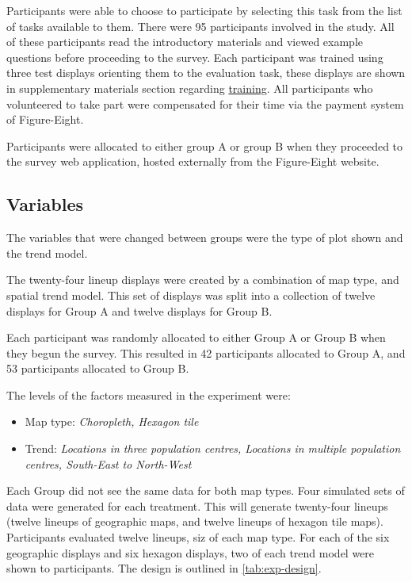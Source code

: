 \documentclass[conference,final,]{IEEEtran}
\providecommand{\tightlist}{%
  \setlength{\itemsep}{0pt}\setlength{\parskip}{0pt}}
\begin{document}
Participants were able to choose to participate by selecting this task from the list of tasks available to them.
There were 95 participants involved in the study. All of these participants read the introductory materials and viewed example questions before proceeding to the survey. Each participant was trained using three test displays orienting them to the evaluation task, these displays are shown in supplementary materials section regarding \protect\hyperlink{training}{training}.
All participants who volunteered to take part were compensated for their time via the payment system of Figure-Eight.

Participants were allocated to either group A or group B when they proceeded to the survey web application, hosted externally from the Figure-Eight website.

\hypertarget{variables}{%
\subsection{Variables}\label{variables}}

The variables that were changed between groups were the type of plot shown and the trend model.

The twenty-four lineup displays were created by a combination of map type, and spatial trend model. This set of displays was split into a collection of twelve displays for Group A and twelve displays for Group B.

Each participant was randomly allocated to either Group A or Group B when they begun the survey. This resulted in 42 participants allocated to Group A, and 53 participants allocated to Group B.

The levels of the factors measured in the experiment were:

\begin{itemize}
\tightlist
\item
  Map type: \emph{Choropleth, Hexagon tile}
\item
  Trend: \emph{Locations in three population centres, Locations in multiple population centres, South-East to North-West}
\end{itemize}

Each Group did not see the same data for both map types. Four simulated sets of data were generated for each treatment.
This will generate twenty-four lineups (twelve lineups of geographic maps, and twelve lineups of hexagon tile maps). Participants evaluated twelve lineups, siz of each map type.
For each of the six geographic displays and six hexagon displays, two of each trend model were shown to participants. The design is outlined in \ref{tab:exp-design}.
\end{document}
